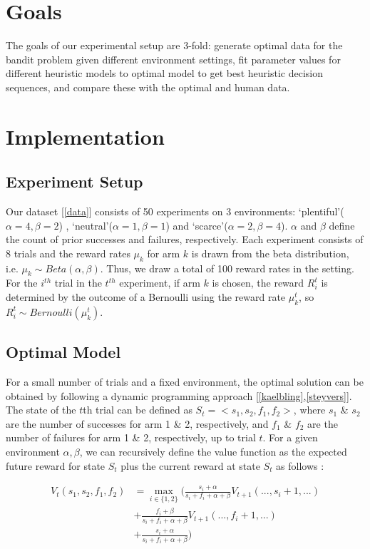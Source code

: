 \section{Goals}
The goals of our experimental setup are 3-fold: generate optimal data for the bandit problem given different environment settings, fit parameter values for different heuristic models to optimal model to get best heuristic decision sequences, and compare these with the optimal and human data.

\section{Implementation}
\subsection{Experiment Setup}
Our dataset [\ref{data}] consists of 50 experiments on 3 environments: ‘plentiful’($\alpha=4,\beta=2$) , ‘neutral’($\alpha=1,\beta=1$) and ‘scarce’($\alpha=2,\beta=4$). $\alpha$ and $\beta$ define the count of prior successes and failures, respectively. Each experiment consists of 8 trials and the reward rates $\mu_k$ for arm $k$ is drawn from the beta distribution, i.e. $\mu_k \sim Beta (\alpha, \beta)$. Thus, we draw a total of 100 reward rates in the setting. For the $i^{th}$ trial in the $t^{th}$ experiment, if arm $k$ is chosen, the reward $R_i^t$ is determined by the outcome of a Bernoulli using the reward rate $\mu_k^t$, so $R_i^t \sim Bernoulli (\mu_k^t)$.

\subsection{Optimal Model}
For a small number of trials and a fixed environment, the optimal solution can be obtained by following a dynamic programming approach [\ref{kaelbling},\ref{steyvers}]. The state of the $t$th trial can be defined as $S_t = <s_1,s_2,f_1,f_2>$, where $s_1$ \& $s_2$ are the number of successes for arm 1 \& 2, respectively, and $f_1$ \& $f_2$ are the number of failures for arm 1 \& 2, respectively, up to trial $t$. For a given environment $\alpha,\beta$, we can recursively define the value function as the expected future reward for state $S_t$ plus the current reward at state $S_t$ as follows : 

\begin{align*}
	V_t(s_1,s_2,f_1,f_2) &= \max_{i \in \{1,2\}} 
	\Big(
	\frac{s_i + \alpha}{s_i + f_i + \alpha + \beta} V_{t+1}(...,s_i+1,...) \\
	&+ \frac{f_i + \beta}{s_i + f_i + \alpha + \beta} V_{t+1}(...,f_i+1,...)\\
	&+ \frac{s_i + \alpha}{s_i + f_i + \alpha + \beta} 
	\Big)	
\end{align*}


